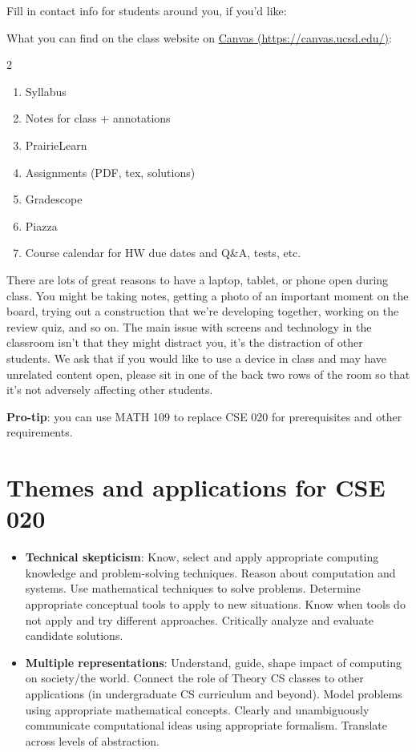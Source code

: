 \documentclass[12pt, oneside]{article}
\begin{document}
Fill in contact info for students around you, if you'd like:

\vfill
\vfill

What you can find on the class website on \href{https://canvas.ucsd.edu/}{Canvas (https://canvas.ucsd.edu/)}:

\begin{multicols}{2}
\begin{enumerate}
\item Syllabus
\item Notes for class + annotations
\item PrairieLearn
\item Assignments (PDF, tex, solutions)
\item Gradescope
\item Piazza
\item Course calendar for HW due dates and Q\&A, tests, etc.
\end{enumerate}
\end{multicols}

\vfill
There are lots of great reasons to have a laptop, tablet, or phone open during class. You might be taking notes, 
getting a photo of an important moment on the board, trying out a construction that we're developing together, working 
on the review quiz, and so on. 
The main issue with screens and technology in the classroom isn't that they might 
distract you, 
it's the distraction of other students. We ask that if you would like to use
a device in class and may 
have unrelated content open, please sit in one of the back two rows of the 
room so that it's not adversely affecting other students.

\vfill

{\bf Pro-tip}: you can use MATH 109 to replace CSE 020 for prerequisites and other requirements.

\vfill

\section*{Themes and applications for CSE 020}
\begin{itemize}
\item {\bf Technical skepticism}: Know, select and apply appropriate computing knowledge and problem-solving techniques. 
Reason about computation and systems. 
Use mathematical techniques to solve problems. 
Determine appropriate conceptual tools to apply to new situations. 
Know when tools do not apply and try different approaches. 
Critically analyze and evaluate candidate solutions.
\item {\bf Multiple representations}: Understand, guide, shape impact of computing on society/the world. 
Connect the role of Theory CS classes to other applications (in undergraduate CS curriculum and beyond). 
Model problems using appropriate mathematical concepts.
Clearly and unambiguously communicate computational ideas using appropriate formalism. 
Translate across levels of abstraction.
\end{itemize}
\end{document}
